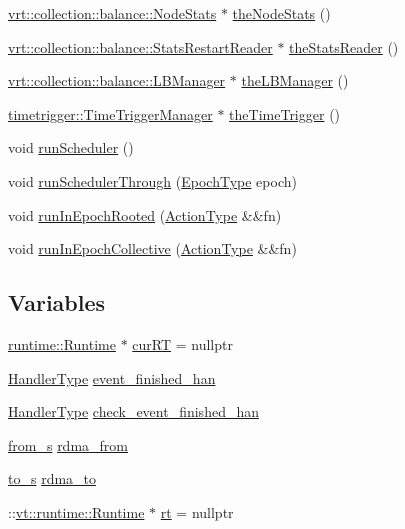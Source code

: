 \begin{DoxyCompactItemize}
\item 
\hyperlink{structvt_1_1vrt_1_1collection_1_1balance_1_1_node_stats}{vrt\+::collection\+::balance\+::\+Node\+Stats} $\ast$ \hyperlink{namespacevt_ae1526efa346612ad330d9a628e596c54}{the\+Node\+Stats} ()
\item 
\hyperlink{structvt_1_1vrt_1_1collection_1_1balance_1_1_stats_restart_reader}{vrt\+::collection\+::balance\+::\+Stats\+Restart\+Reader} $\ast$ \hyperlink{namespacevt_ad73860100c7d2ca1d833eab74942ee73}{the\+Stats\+Reader} ()
\item 
\hyperlink{structvt_1_1vrt_1_1collection_1_1balance_1_1_l_b_manager}{vrt\+::collection\+::balance\+::\+L\+B\+Manager} $\ast$ \hyperlink{namespacevt_a05187076eac8c66c9951b062b0955520}{the\+L\+B\+Manager} ()
\item 
\hyperlink{structvt_1_1timetrigger_1_1_time_trigger_manager}{timetrigger\+::\+Time\+Trigger\+Manager} $\ast$ \hyperlink{namespacevt_a1e1a39cdf2a3fc1adefcdfcca4716bf2}{the\+Time\+Trigger} ()
\item 
void \hyperlink{namespacevt_a729e4eb07e2492f648c968fd84460bab}{run\+Scheduler} ()
\item 
void \hyperlink{namespacevt_aa550774c1c9c668176ce535fd7d58fb0}{run\+Scheduler\+Through} (\hyperlink{namespacevt_a985a5adf291c34a3ca263b3378388236}{Epoch\+Type} epoch)
\item 
void \hyperlink{namespacevt_ad419c00d2e4ac8601ea3b1dec633f3f7}{run\+In\+Epoch\+Rooted} (\hyperlink{namespacevt_ae0a5a7b18cc99d7b732cb4d44f46b0f3}{Action\+Type} \&\&fn)
\item 
void \hyperlink{namespacevt_a291cca514e6f66292df339cd92a54502}{run\+In\+Epoch\+Collective} (\hyperlink{namespacevt_ae0a5a7b18cc99d7b732cb4d44f46b0f3}{Action\+Type} \&\&fn)
\end{DoxyCompactItemize}
\subsection*{Variables}
\begin{DoxyCompactItemize}
\item 
\hyperlink{structvt_1_1runtime_1_1_runtime}{runtime\+::\+Runtime} $\ast$ \hyperlink{namespacevt_a07abc8f1752a784f54c226bbc4c3b1fe}{cur\+RT} = nullptr
\item 
\hyperlink{namespacevt_af64846b57dfcaf104da3ef6967917573}{Handler\+Type} \hyperlink{namespacevt_a570bc5403031e45a957476ffae6f67c1}{event\+\_\+finished\+\_\+han}
\item 
\hyperlink{namespacevt_af64846b57dfcaf104da3ef6967917573}{Handler\+Type} \hyperlink{namespacevt_a9764c5fa4f463d23a7db5d56cc121881}{check\+\_\+event\+\_\+finished\+\_\+han}
\item 
\hyperlink{structvt_1_1from__s}{from\+\_\+s} \hyperlink{namespacevt_ae446ed1f5bb8bba34af5c747ea1f244d}{rdma\+\_\+from}
\item 
\hyperlink{structvt_1_1to__s}{to\+\_\+s} \hyperlink{namespacevt_a627aea388cdbf2818bf1393dca90938e}{rdma\+\_\+to}
\item 
\+::\hyperlink{structvt_1_1runtime_1_1_runtime}{vt\+::runtime\+::\+Runtime} $\ast$ \hyperlink{namespacevt_acce65ec10b513659274e722365aaa36d}{rt} = nullptr
\end{DoxyCompactItemize}


